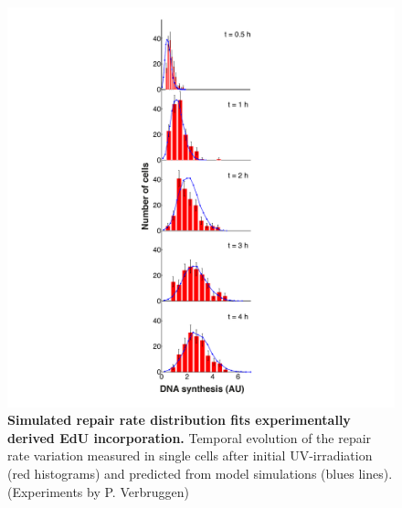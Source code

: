 \begin{figure}[htbp]
	\begin{center}
		\includegraphics[width=1\textwidth]{Abbildungen/figure3_7.pdf}
		\caption{\textbf{Simulated repair rate distribution fits experimentally derived EdU incorporation.} Temporal evolution of the repair rate variation  measured in single cells after initial UV-irradiation (red histograms) and predicted from model simulations (blues lines). (Experiments by P. Verbruggen)}
		\label{fig:ModelData_tempVar}
	\end{center}
\end{figure}
